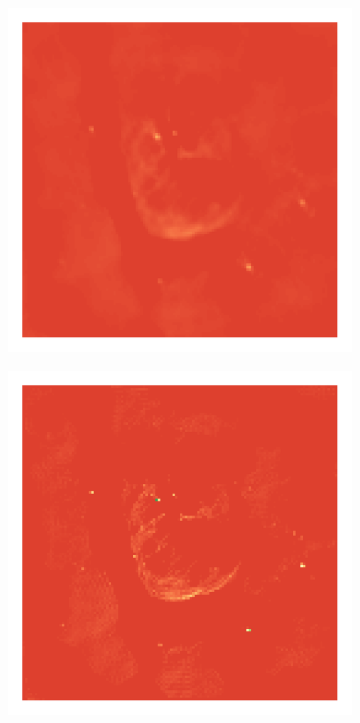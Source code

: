 \begin{figure}[h]
	\begin{subfigure}[b]{0.24\linewidth}
		\vspace{10pt}
		\includegraphics[width=\linewidth, trim={18px 19px 18px 18px}, clip]{./chapters/05.results/g55/L2_model.png}
	\end{subfigure}
	\begin{subfigure}[b]{0.24\linewidth}
		\includegraphics[width=\linewidth, trim={18px 19px 18px 18px}, clip]{./chapters/05.results/g55/L1+L2_model.png}

\end{subfigure}
\end{figure}
